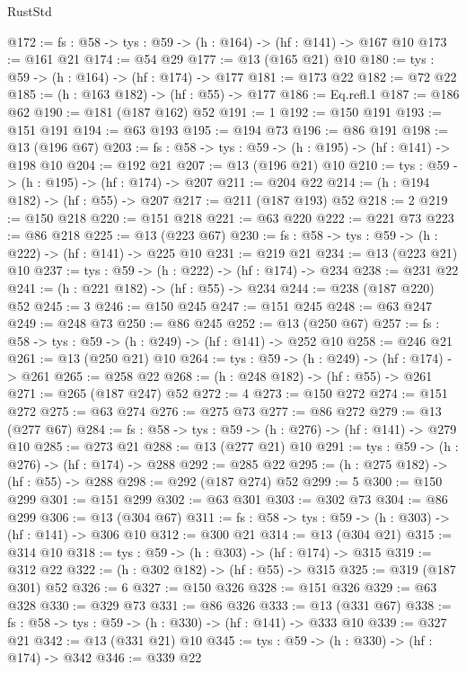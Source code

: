 \begin{lexlean}{RustStd}
\begin{coremodule}
@172 := {fs : @58} -> {tys : @59} -> (h : @164) -> (hf : @141) -> @167 @10
@173 := @161 @21
@174 := @54 @29
@177 := @13 (@165 @21) @10
@180 := {tys : @59} -> (h : @164) -> (hf : @174) -> @177
@181 := @173 @22
@182 := @72 @22
@185 := (h : @163 @182) -> (hf : @55) -> @177
@186 := Eq.refl.{1}
@187 := @186 @62
@190 := @181 (@187 @162) @52
@191 := 1
@192 := @150 @191
@193 := @151 @191
@194 := @63 @193
@195 := @194 @73
@196 := @86 @191
@198 := @13 (@196 @67)
@203 := {fs : @58} -> {tys : @59} -> (h : @195) -> (hf : @141) -> @198 @10
@204 := @192 @21
@207 := @13 (@196 @21) @10
@210 := {tys : @59} -> (h : @195) -> (hf : @174) -> @207
@211 := @204 @22
@214 := (h : @194 @182) -> (hf : @55) -> @207
@217 := @211 (@187 @193) @52
@218 := 2
@219 := @150 @218
@220 := @151 @218
@221 := @63 @220
@222 := @221 @73
@223 := @86 @218
@225 := @13 (@223 @67)
@230 := {fs : @58} -> {tys : @59} -> (h : @222) -> (hf : @141) -> @225 @10
@231 := @219 @21
@234 := @13 (@223 @21) @10
@237 := {tys : @59} -> (h : @222) -> (hf : @174) -> @234
@238 := @231 @22
@241 := (h : @221 @182) -> (hf : @55) -> @234
@244 := @238 (@187 @220) @52
@245 := 3
@246 := @150 @245
@247 := @151 @245
@248 := @63 @247
@249 := @248 @73
@250 := @86 @245
@252 := @13 (@250 @67)
@257 := {fs : @58} -> {tys : @59} -> (h : @249) -> (hf : @141) -> @252 @10
@258 := @246 @21
@261 := @13 (@250 @21) @10
@264 := {tys : @59} -> (h : @249) -> (hf : @174) -> @261
@265 := @258 @22
@268 := (h : @248 @182) -> (hf : @55) -> @261
@271 := @265 (@187 @247) @52
@272 := 4
@273 := @150 @272
@274 := @151 @272
@275 := @63 @274
@276 := @275 @73
@277 := @86 @272
@279 := @13 (@277 @67)
@284 := {fs : @58} -> {tys : @59} -> (h : @276) -> (hf : @141) -> @279 @10
@285 := @273 @21
@288 := @13 (@277 @21) @10
@291 := {tys : @59} -> (h : @276) -> (hf : @174) -> @288
@292 := @285 @22
@295 := (h : @275 @182) -> (hf : @55) -> @288
@298 := @292 (@187 @274) @52
@299 := 5
@300 := @150 @299
@301 := @151 @299
@302 := @63 @301
@303 := @302 @73
@304 := @86 @299
@306 := @13 (@304 @67)
@311 := {fs : @58} -> {tys : @59} -> (h : @303) -> (hf : @141) -> @306 @10
@312 := @300 @21
@314 := @13 (@304 @21)
@315 := @314 @10
@318 := {tys : @59} -> (h : @303) -> (hf : @174) -> @315
@319 := @312 @22
@322 := (h : @302 @182) -> (hf : @55) -> @315
@325 := @319 (@187 @301) @52
@326 := 6
@327 := @150 @326
@328 := @151 @326
@329 := @63 @328
@330 := @329 @73
@331 := @86 @326
@333 := @13 (@331 @67)
@338 := {fs : @58} -> {tys : @59} -> (h : @330) -> (hf : @141) -> @333 @10
@339 := @327 @21
@342 := @13 (@331 @21) @10
@345 := {tys : @59} -> (h : @330) -> (hf : @174) -> @342
@346 := @339 @22

\end{coremodule}
\end{lexlean}
